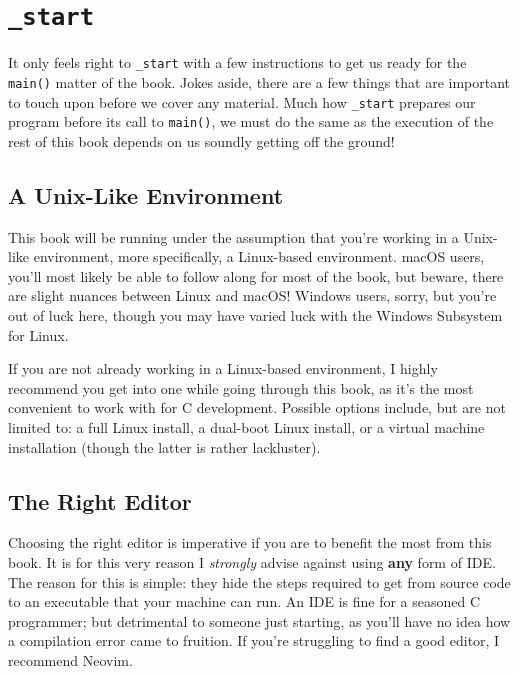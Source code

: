 %

\chapter{\texttt{\_start}}

It only feels right to \texttt{_start} with a few instructions to
get us ready for the \texttt{main()} matter of the book.  Jokes
aside, there are a few things that are important to touch upon before we
cover any material.  Much how \texttt{_start} prepares our
program before its call to \texttt{main()}, we must do the same
as the execution of the rest of this book depends on us soundly getting
off the ground!

\section{A Unix-Like Environment}

This book will be running under the assumption that you're working in a
Unix-like environment, more specifically, a Linux-based environment.
macOS users, you'll most likely be able to follow along for most of the
book, but beware, there are slight nuances between Linux and macOS\@!
Windows users, sorry, but you're out of luck here, though you may have
varied luck with the Windows Subsystem for Linux.

If you are not already working in a Linux-based environment, I highly
recommend you get into one while going through this book, as it's the
most convenient to work with for C development.  Possible options
include, but are not limited to: a full Linux install, a dual-boot Linux
install, or a virtual machine installation (though the latter is rather
lackluster).

\section{The Right Editor}

Choosing the right editor is imperative if you are to benefit the most
from this book.  It is for this very reason I \emph{strongly} advise
against using \textbf{any} form of IDE\@.  The reason for this is
simple: they hide the steps required to get from source code to an
executable that your machine can run.  An IDE is fine for a seasoned C
programmer; but detrimental to someone just starting, as you'll have no
idea how a compilation error came to fruition.  If you're struggling to
find a good editor, I recommend Neovim.

